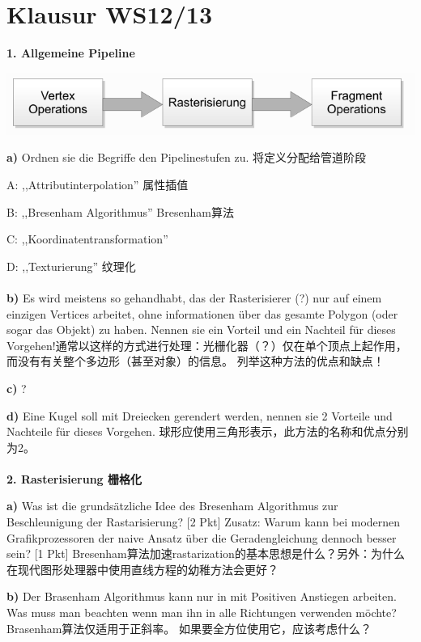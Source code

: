\documentclass[fleqn]{article}
\begin{document}
\section{Klausur WS12/13}

\noindent\textbf{1. Allgemeine Pipeline}

\begin{center}
    \includegraphics[scale=0.6]{6.png}
\end{center}

\indent\textbf{a)} Ordnen sie die Begriffe den Pipelinestufen zu. 将定义分配给管道阶段 

\indent\indent A: ,,Attributinterpolation'' 属性插值

\indent\indent B: ,,Bresenham Algorithmus'' Bresenham算法

\indent\indent C: ,,Koordinatentransformation''

\indent\indent D: ,,Texturierung'' 纹理化
\\
\\
\indent\textbf{b)} Es wird meistens so gehandhabt, das der Rasterisierer (?) nur auf einem einzigen Vertices arbeitet, ohne informationen über das gesamte Polygon (oder sogar das Objekt) zu haben. Nennen sie ein Vorteil und ein Nachteil für dieses Vorgehen!通常以这样的方式进行处理：光栅化器（？）仅在单个顶点上起作用，而没有有关整个多边形（甚至对象）的信息。 列举这种方法的优点和缺点！

\indent\textbf{c)} ?

\indent\textbf{d)} Eine Kugel soll mit Dreiecken gerendert werden, nennen sie 2 Vorteile und Nachteile für dieses Vorgehen. 球形应使用三角形表示，此方法的名称和优点分别为2。
\\
\\
\noindent\textbf{2. Rasterisierung 栅格化}

\indent\textbf{a)} Was ist die grundsätzliche Idee des Bresenham Algorithmus zur Beschleunigung der Rastarisierung? [2 Pkt] Zusatz: Warum kann bei modernen Grafikprozessoren der naive Ansatz über die Geradengleichung dennoch besser sein? [1 Pkt]
Bresenham算法加速rastarization的基本思想是什么？另外：为什么在现代图形处理器中使用直线方程的幼稚方法会更好？

\indent\textbf{b)} Der Brasenham Algorithmus kann nur in mit Positiven Anstiegen arbeiten. Was muss man beachten wenn man ihn in alle Richtungen verwenden möchte?
Brasenham算法仅适用于正斜率。 如果要全方位使用它，应该考虑什么？
\end{document}
